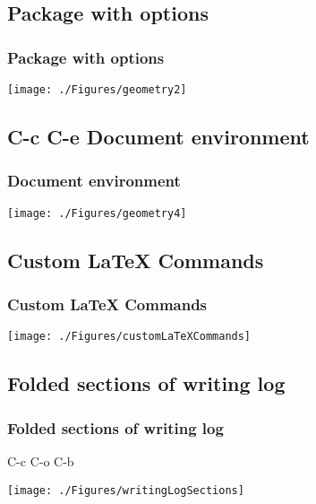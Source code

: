 \documentclass{beamer}
\begin{document}
\subsection{Package with options}
\begin{frame}
\frametitle{Package with options}
\begin{center}
\begin{center}
    \texttt{[image: ./Figures/geometry2]}
\end{center}
\end{center}
\end{frame}


\subsection{C-c C-e Document environment}
\begin{frame}
\frametitle{Document environment}
\begin{center}
\begin{center}
    \texttt{[image: ./Figures/geometry4]}
\end{center}
\end{center}
\end{frame}


\subsection{Custom \LaTeX{} Commands}
\begin{frame}
\frametitle{Custom \LaTeX{} Commands}
\begin{center}
\begin{center}
    \texttt{[image: ./Figures/customLaTeXCommands]}
\end{center}
\end{center}
\end{frame}


\subsection{Folded sections of writing log}
\begin{frame}
\frametitle{Folded sections of writing log}
C-c C-o C-b
\begin{center}
    \texttt{[image: ./Figures/writingLogSections]}
\end{center}
\end{frame}
\note{ }
\end{document}
